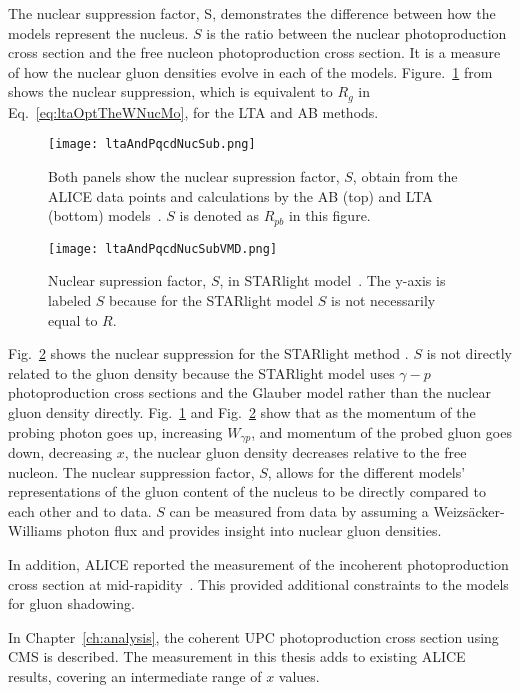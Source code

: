   The nuclear suppression factor, S, demonstrates the difference between how 
    the models represent the nucleus. 
  $S$ is the ratio between the nuclear photoproduction cross section and the     
    free nucleon photoproduction cross section.
  It is a measure of how the nuclear gluon densities evolve in each of the 
    models. 
  Figure.~\ref{fig:ltaAndPqcdNucSub} from \cite{lta2013.05} shows the nuclear 
    suppression, which is equivalent to $R_g$ in Eq.~\ref{eq:ltaOptTheWNucMo}, 
    for the LTA and AB methods.
  \begin{figure}[h] 
    \begin{center}
      \texttt{[image: ltaAndPqcdNucSub.png]}
    \end{center}
    \caption{ \label{fig:ltaAndPqcdNucSub} Both panels show the nuclear 
      supression factor, $S$, obtain from the ALICE data points and calculations
      by the AB (top) and LTA (bottom) models~\cite{lta2013.05}. $S$ is denoted 
      as $R_{pb}$ in this figure.}
  \end{figure}
  \begin{figure}
    \begin{center}
      \texttt{[image: ltaAndPqcdNucSubVMD.png]}
    \end{center}
    \caption{ \label{fig:ltaAndPqcdNucSubSTARlight} Nuclear supression factor, $S$, in STARlight model~\cite{lta2013.05}.
      The y-axis is labeled $S$ because for the STARlight model $S$ is not 
      necessarily equal to $R$.}
  \end{figure}
  Fig.~\ref{fig:ltaAndPqcdNucSubSTARlight} shows the nuclear suppression for the 
    STARlight method \cite{lta2013.05}. 
  $S$ is not directly related to the gluon density because the STARlight model
    uses $\gamma-p$ photoproduction cross sections and the Glauber model 
    rather than the nuclear gluon density directly.
  Fig.~\ref{fig:ltaAndPqcdNucSub} and Fig.~\ref{fig:ltaAndPqcdNucSubSTARlight} 
    show that as the momentum of the probing photon goes up, increasing 
    $W_{\gamma p}$, and momentum of the probed gluon goes down, decreasing $x$, 
    the nuclear gluon density decreases relative to the free nucleon. 
  The nuclear suppression factor, $S$, allows for the different models' 
    representations of the gluon content of the nucleus to be directly compared
    to each other and to data. 
  $S$ can be measured from data by assuming a Weizs\"{a}cker-Williams photon flux and 
    provides insight into nuclear gluon densities.

  In addition, ALICE reported the measurement of the incoherent \JPsi{} 
    photoproduction cross section at mid-rapidity~\cite{Abbas:2013oua}.
  This provided additional constraints to the models for gluon shadowing. 

  In Chapter~\ref{ch:analysis}, the coherent UPC \JPsi{} photoproduction 
    cross section using CMS is described.
  The measurement in this thesis adds to existing ALICE results, covering
    an intermediate range of $x$ values. 
